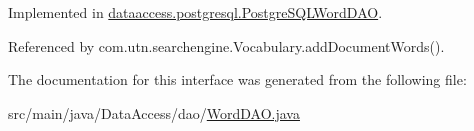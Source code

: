 \-Implemented in \hyperlink{classdataaccess_1_1postgresql_1_1_postgre_s_q_l_word_d_a_o_af4dd5f009436282ecd62b19a19c2f133}{dataaccess.\-postgresql.\-Postgre\-S\-Q\-L\-Word\-D\-A\-O}.



\-Referenced by com.\-utn.\-searchengine.\-Vocabulary.\-add\-Document\-Words().



\-The documentation for this interface was generated from the following file\-:\begin{DoxyCompactItemize}
\item 
src/main/java/\-Data\-Access/dao/\hyperlink{_word_d_a_o_8java}{\-Word\-D\-A\-O.\-java}\end{DoxyCompactItemize}
